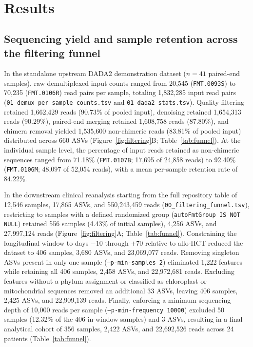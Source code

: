 
\section{Results}

\subsection{Sequencing yield and sample retention across the filtering funnel}
In the standalone upstream DADA2 demonstration dataset ($n = 41$ paired-end samples), raw demultiplexed input counts ranged from 20,545 (\texttt{FMT.0093S}) to 70,235 (\texttt{FMT.0106R}) read pairs per sample, totaling 1,832,285 input read pairs (\texttt{01\_demux\_per\_sample\_counts.tsv} and \texttt{01\_dada2\_stats.tsv}). Quality filtering retained 1,662,429 reads (90.73\% of pooled input), denoising retained 1,654,313 reads (90.29\%), paired-end merging retained 1,608,758 reads (87.80\%), and chimera removal yielded 1,535,600 non-chimeric reads (83.81\% of pooled input) distributed across 660 ASVs (Figure~\ref{fig:filtering}B; Table~\ref{tab:funnel}). At the individual sample level, the percentage of input reads retained as non-chimeric sequences ranged from 71.18\% (\texttt{FMT.0107B}; 17,695 of 24,858 reads) to 92.40\% (\texttt{FMT.0106M}; 48,097 of 52,054 reads), with a mean per-sample retention rate of 84.22\%.

In the downstream clinical reanalysis starting from the full repository table of 12,546 samples, 17,865 ASVs, and 550,243,459 reads (\texttt{00\_filtering\_funnel.tsv}), restricting to samples with a defined randomized group (\texttt{autoFmtGroup IS NOT NULL}) retained 556 samples (4.43\% of initial samples), 4,256 ASVs, and 27,997,124 reads (Figure~\ref{fig:filtering}A; Table~\ref{tab:funnel}). Constraining the longitudinal window to days $-10$ through $+70$ relative to allo-HCT reduced the dataset to 406 samples, 3,680 ASVs, and 23,069,077 reads. Removing singleton ASVs present in only one sample (\texttt{--p-min-samples 2}) eliminated 1,222 features while retaining all 406 samples, 2,458 ASVs, and 22,972,681 reads. Excluding features without a phylum assignment or classified as chloroplast or mitochondrial sequences removed an additional 33 ASVs, leaving 406 samples, 2,425 ASVs, and 22,909,139 reads. Finally, enforcing a minimum sequencing depth of 10,000 reads per sample (\texttt{--p-min-frequency 10000}) excluded 50 samples (12.32\% of the 406 in-window samples) and 3 ASVs, resulting in a final analytical cohort of 356 samples, 2,422 ASVs, and 22,692,526 reads across 24 patients (Table~\ref{tab:funnel}).

